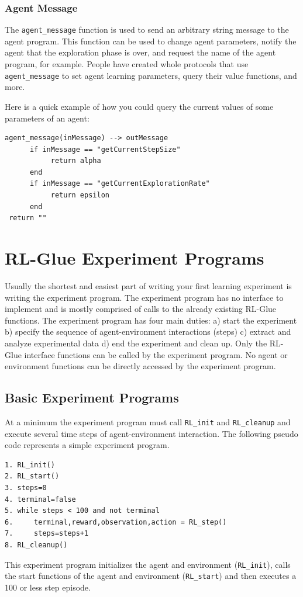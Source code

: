 \documentclass[11pt]{article}
\begin{document}
\subsubsection{Agent Message}
The \texttt{agent\_message} function is used to send an arbitrary string message to the agent program. This function can be used to change agent parameters, notify the agent that the exploration phase is over, and request the name of the agent program, for example.  People have created whole protocols that use \texttt{agent\_message} to set agent learning parameters, query their value functions, and more.

Here is a quick example of how you could query the current values of some parameters of an agent:
\begin{verbatim}
agent_message(inMessage) --> outMessage
      if inMessage == "getCurrentStepSize"  
           return alpha
      end 
      if inMessage == "getCurrentExplorationRate"  
           return epsilon
      end 
 return ""
\end{verbatim}



\section{RL-Glue Experiment Programs}
\label{exp}
Usually the shortest and easiest part of writing your first learning experiment is writing the experiment program. The experiment program has no interface to implement and is mostly comprised of calls to the already existing RL-Glue functions. The experiment program has four main duties: a) start the experiment b) specify the sequence of agent-environment interactions (steps) c) extract and analyze experimental data d) end the experiment and clean up.  Only the RL-Glue interface functions can be called by the experiment program. No agent or environment functions can be directly accessed by the experiment program.

\subsection{Basic Experiment Programs}
\label{expp1}

At a minimum the experiment program must call \texttt{RL\_init} and \texttt{RL\_cleanup} and execute several time steps of agent-environment interaction. The following pseudo code represents a simple experiment program.
\begin{verbatim}
1. RL_init()
2. RL_start()
3. steps=0
4. terminal=false 
5. while steps < 100 and not terminal
6.     terminal,reward,observation,action = RL_step()
7.     steps=steps+1
8. RL_cleanup()
\end{verbatim}
This experiment program initializes the agent and environment (\texttt{RL\_init}), calls the start functions of the agent and environment (\texttt{RL\_start}) and then executes a 100 or less step episode. 
\end{document}
